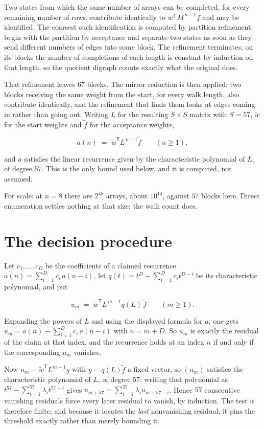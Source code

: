\documentclass[11pt]{article}
\theoremstyle{definition}
\begin{document}
Two states from which the same number of arrays can be completed, for every remaining number of rows, contribute identically to $w^{\mathsf T}M^{\,n-1}f$ and may be identified. The coarsest such identification is computed by partition refinement: begin with the partition by acceptance and separate two states as soon as they send different numbers of edges into some block. The refinement terminates; on its blocks the number of completions of each length is constant by induction on that length, so the quotient digraph counts exactly what the original does.

That refinement leaves $67$ blocks. The mirror reduction is then applied: two blocks receiving the same weight from the start, for every walk length, also contribute identically, and the refinement that finds them looks at edges coming in rather than going out. Writing $L$ for the resulting $S \times S$ matrix with $S = 57$, $\tilde w$ for the start weights and $\tilde f$ for the acceptance weights,

\[a(n) \;=\; \tilde w^{\mathsf T} L^{\,n-1} \tilde f \qquad (n \ge 1),\]

and $a$ satisfies the linear recurrence given by the characteristic polynomial of $L$, of degree $57$. This is the only bound used below, and it is computed, not assumed.

For scale: at $n = 8$ there are $2^{48}$ arrays, about $10^{14}$, against $57$ blocks here. Direct enumeration settles nothing at that size; the walk count does.

\section{The decision procedure}

Let $c_1,\dots,c_D$ be the coefficients of a claimed recurrence $a(n) = \sum_{i=1}^{D} c_i\,a(n-i)$, let $q(t) = t^{D} - \sum_{i=1}^{D} c_i t^{D-i}$ be its characteristic polynomial, and put

\[u_m \;=\; \tilde w^{\mathsf T} L^{\,m-1} q(L)\,\tilde f \qquad (m \ge 1).\]

Expanding the powers of $L$ and using the displayed formula for $a$, one gets $u_m = a(n) - \sum_{i=1}^{D} c_i\,a(n-i)$ with $n = m + D$. So $u_m$ is exactly the residual of the claim at that index, and the recurrence holds at an index $n$ if and only if the corresponding $u_m$ vanishes.

Now $u_m = \tilde w^{\mathsf T} L^{m-1} y$ with $y = q(L)\tilde f$ a fixed vector, so $(u_m)$ satisfies the characteristic polynomial of $L$, of degree $57$: writing that polynomial as $t^{57} - \sum_{i=1}^{57} \lambda_i t^{57-i}$ gives $u_{m+57} = \sum_{i=1}^{57} \lambda_i u_{m+57-i}$. Hence $57$ consecutive vanishing residuals force every later residual to vanish, by induction. The test is therefore finite; and because it locates the {\itshape last} nonvanishing residual, it pins the threshold exactly rather than merely bounding it.
\end{document}
